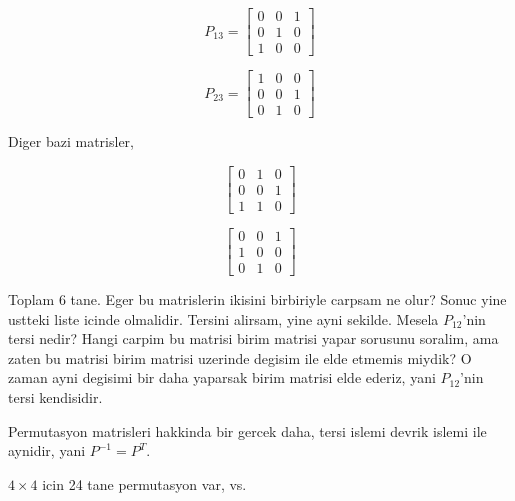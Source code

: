 \documentclass[12pt,fleqn]{article}\usepackage{../common}
\begin{document}
\[ P_{13} = 
\left[\begin{array}{rrr}
0 & 0 & 1\\
0 & 1 & 0 \\
1  & 0 & 0
\end{array}\right]
 \]

\[ P_{23} = 
\left[\begin{array}{rrr}
1 & 0 & 0\\
0 & 0 & 1 \\
0  & 1 & 0
\end{array}\right]
 \]

Diger bazi matrisler, 

\[  
\left[\begin{array}{rrr}
0 & 1 & 0\\
0 & 0 & 1 \\
1  & 1 & 0
\end{array}\right]
 \]

\[  
\left[\begin{array}{rrr}
0 & 0 & 1\\
1 & 0 & 0 \\
0  & 1 & 0
\end{array}\right]
 \]
 
Toplam 6 tane. Eger bu matrislerin ikisini birbiriyle carpsam ne olur?
Sonuc yine ustteki liste icinde olmalidir. Tersini alirsam, yine ayni
sekilde. Mesela $P_{12}$'nin tersi nedir? Hangi carpim bu matrisi birim
matrisi yapar sorusunu soralim, ama zaten bu matrisi birim matrisi uzerinde
degisim ile elde etmemis miydik? O zaman ayni degisimi bir daha yaparsak
birim matrisi elde ederiz, yani $P_{12}$'nin tersi kendisidir. 

Permutasyon matrisleri hakkinda bir gercek daha, tersi islemi devrik islemi
ile aynidir, yani $P ^{-1}  = P ^{T} $. 

$4 \times 4$ icin 24 tane permutasyon var, vs.
\end{document}
